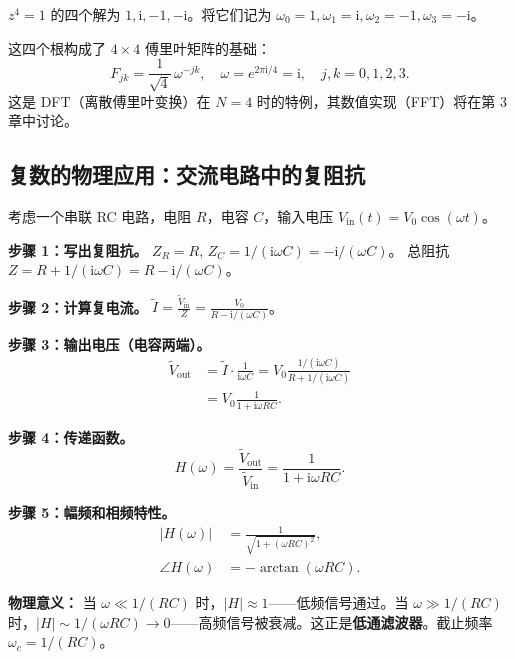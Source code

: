 \begin{example}[四次单位根与离散傅里叶变换]
$z^4 = 1$ 的四个解为 $1,\mathrm{i},-1,-\mathrm{i}$。将它们记为 $\omega_0=1,\omega_1=\mathrm{i},\omega_2=-1,\omega_3=-\mathrm{i}$。

这四个根构成了 $4\times4$ 傅里叶矩阵的基础：
\begin{equation}
F_{jk} = \frac{1}{\sqrt{4}}\,\omega^{-jk},\quad \omega = e^{2\pi\mathrm{i}/4} = \mathrm{i},\quad j,k=0,1,2,3.
\end{equation}
这是 DFT（离散傅里叶变换）在 $N=4$ 时的特例，其数值实现（FFT）将在第 3 章中讨论。
\end{example}

\subsection{复数的物理应用：交流电路中的复阻抗}

\begin{example}
考虑一个串联 RC 电路，电阻 $R$，电容 $C$，输入电压 $V_{\text{in}}(t) = V_0\cos(\omega t)$。

\textbf{步骤 1：写出复阻抗。}
$Z_R = R$, $Z_C = 1/(\mathrm{i}\omega C) = -\mathrm{i}/(\omega C)$。
总阻抗 $Z = R + 1/(\mathrm{i}\omega C) = R - \mathrm{i}/(\omega C)$。

\textbf{步骤 2：计算复电流。}
$\tilde{I} = \frac{\tilde{V}_{\text{in}}}{Z} = \frac{V_0}{R - \mathrm{i}/(\omega C)}$。

\textbf{步骤 3：输出电压（电容两端）。}
\begin{align*}
\tilde{V}_{\text{out}} &= \tilde{I} \cdot \frac{1}{\mathrm{i}\omega C}
= V_0 \frac{1/(\mathrm{i}\omega C)}{R + 1/(\mathrm{i}\omega C)} \\
&= V_0 \frac{1}{1 + \mathrm{i}\omega RC}.
\end{align*}

\textbf{步骤 4：传递函数。}
\begin{equation}
H(\omega) = \frac{\tilde{V}_{\text{out}}}{\tilde{V}_{\text{in}}}
= \frac{1}{1 + \mathrm{i}\omega RC}.
\end{equation}

\textbf{步骤 5：幅频和相频特性。}
\begin{align}
|H(\omega)| &= \frac{1}{\sqrt{1 + (\omega RC)^2}},\\
\angle H(\omega) &= -\arctan(\omega RC).
\end{align}

\textbf{物理意义：} 当 $\omega \ll 1/(RC)$ 时，$|H|\approx 1$——低频信号通过。当 $\omega \gg 1/(RC)$ 时，$|H|\sim 1/(\omega RC) \to 0$——高频信号被衰减。这正是\textbf{低通滤波器}。截止频率 $\omega_c = 1/(RC)$。
\end{example}

